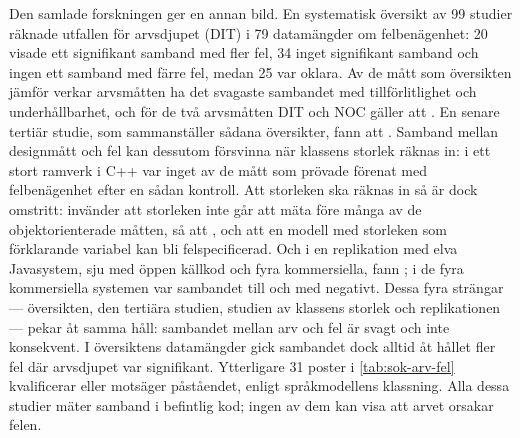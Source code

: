 Den samlade forskningen ger en annan bild.  En systematisk översikt av
99 studier räknade utfallen för arvsdjupet (DIT) i 79 datamängder om
felbenägenhet: 20 visade ett signifikant samband med fler fel, 34 inget
signifikant samband och ingen ett samband med färre fel, medan 25 var
oklara\autocite[671--672]{Jabangwe2015SLR}.  Av de mått som översikten
jämför verkar arvsmåtten ha det svagaste sambandet med tillförlitlighet
och underhållbarhet\autocite[677]{Jabangwe2015SLR}, och för de två
arvsmåtten DIT och NOC gäller att
.
En senare tertiär studie, som sammanställer sådana översikter, fann att
.  Samband mellan designmått och fel kan dessutom försvinna
när klassens storlek räknas in: i ett stort ramverk i C++ var inget av
de mått som \textcite{ElEmam2001Confounding} prövade förenat med
felbenägenhet efter en sådan kontroll.  Att storleken ska räknas in så
är dock omstritt: \textcite{Evanco2003Comments} invänder att storleken
inte går att mäta före många av de objektorienterade måtten, så att
, och att en modell med storleken som förklarande variabel kan
bli felspecificerad.  Och i en replikation med elva
Javasystem, sju med öppen källkod och fyra kommersiella, fann
\textcite{Counsell2021WhereBugs}
;
i de fyra kommersiella systemen var sambandet till och med negativt.
Dessa fyra strängar --- översikten, den tertiära studien, studien av
klassens storlek och replikationen --- pekar åt samma håll: sambandet
mellan arv och fel är svagt och inte konsekvent.  I översiktens
datamängder gick sambandet dock alltid åt hållet fler fel där arvsdjupet
var signifikant\autocite[672]{Jabangwe2015SLR}.  Ytterligare 31 poster i
\cref{tab:sok-arv-fel} kvalificerar eller motsäger påståendet, enligt
språkmodellens klassning.  Alla
dessa studier mäter samband i befintlig kod; ingen av dem kan visa att
arvet orsakar felen.

